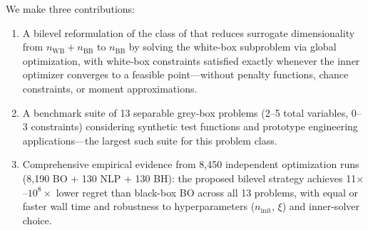 \documentclass[12pt,a4paper]{article}%
\theoremstyle{plain}%
\theoremstyle{remark}%
\theoremstyle{definition}%
\def\WB{\mathrm{WB}}
\def\BB{\mathrm{BB}}
\providecommand{\DIFaddtex}[1]{{\protect\color{blue}\uwave{#1}}} %
\providecommand{\DIFaddbegin}{} %
\providecommand{\DIFaddend}{} %
\providecommand{\DIFdelbegin}{} %
\providecommand{\DIFdelend}{} %
\providecommand{\DIFadd}[1]{\texorpdfstring{\DIFaddtex{#1}}{#1}} %
\newcommand{\DIFscaledelfig}{0.5}
\newlength{\DIFdelgraphicswidth} %
\newlength{\DIFdelgraphicsheight} %
\newcommand{\DIFaddincludegraphics}[2][]{{\color{blue}\fbox{\DIFOincludegraphics[#1]{#2}}}} %
\newcommand{\DIFdelincludegraphics}[2][]{%
\sbox{\DIFdelgraphicsbox}{\DIFOincludegraphics[#1]{#2}}%
\settoboxwidth{\DIFdelgraphicswidth}{\DIFdelgraphicsbox} %
\settoboxtotalheight{\DIFdelgraphicsheight}{\DIFdelgraphicsbox} %
\scalebox{\DIFscaledelfig}{%
\parbox[b]{\DIFdelgraphicswidth}{\usebox{\DIFdelgraphicsbox}\\[-\baselineskip] \rule{\DIFdelgraphicswidth}{0em}}\llap{\resizebox{\DIFdelgraphicswidth}{\DIFdelgraphicsheight}{%
\setlength{\unitlength}{\DIFdelgraphicswidth}%
\begin{picture}(1,1)%
\thicklines\linethickness{2pt} %
{\color[rgb]{1,0,0}\put(0,0){\framebox(1,1){}}}%
{\color[rgb]{1,0,0}\put(0,0){\line( 1,1){1}}}%
{\color[rgb]{1,0,0}\put(0,1){\line(1,-1){1}}}%
\end{picture}%
}\hspace*{3pt}}} %
} %
\DeclareRobustCommand{\DIFaddbegin}{\DIFOaddbegin \let\includegraphics\DIFaddincludegraphics} %
\DeclareRobustCommand{\DIFaddend}{\DIFOaddend \let\includegraphics\DIFOincludegraphics} %
\DeclareRobustCommand{\DIFdelbegin}{\DIFOdelbegin \let\includegraphics\DIFdelincludegraphics} %
\DeclareRobustCommand{\DIFdelend}{\DIFOaddend \let\includegraphics\DIFOincludegraphics} %
\begin{document}
We make three contributions:
\DIFdelbegin %
\DIFdelend \DIFaddbegin \begin{enumerate}
    \item A bilevel reformulation of the class of  that reduces surrogate dimensionality from $n_{\WB}+n_{\BB}$ to $n_{\BB}$ by solving the white-box subproblem via global optimization, with white-box constraints satisfied exactly whenever the inner optimizer converges to a feasible point---without penalty functions, chance constraints, or moment approximations.
    \item A benchmark suite of 13 separable grey-box problems (2--5 total variables, 0--3 constraints) considering synthetic test functions and prototype engineering applications---the largest such suite for this problem class.
    \item Comprehensive empirical evidence from 8{,}450 independent optimization runs (8{,}190 BO + 130 NLP + 130 BH): the proposed bilevel strategy achieves 11$\times$--$10^{8}\times$ lower regret than black-box BO across all 13 problems, with equal or faster wall time and robustness to hyperparameters ($n_\text{init}$, $\xi$) and inner-solver choice.
\end{enumerate}

\DIFaddend 

\DIFaddbegin \section{\DIFadd{Problem Formulation}}\label{sec:problem_formulation}
\end{document}

